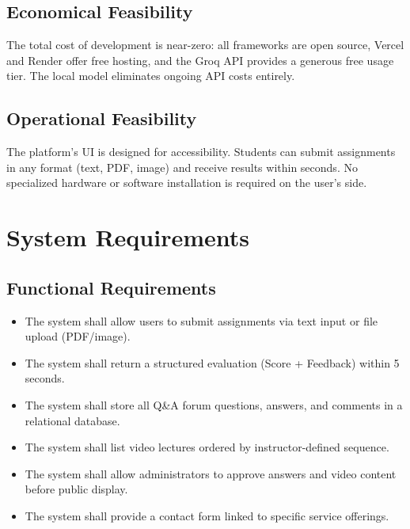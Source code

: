 \documentclass[12pt,a4paper]{report}
\begin{document}
\subsection{Economical Feasibility}
The total cost of development is near-zero: all frameworks are open source, Vercel and
Render offer free hosting, and the Groq API provides a generous free usage tier. The local
model eliminates ongoing API costs entirely.

\subsection{Operational Feasibility}
The platform's UI is designed for accessibility. Students can submit assignments in any
format (text, PDF, image) and receive results within seconds. No specialized hardware or
software installation is required on the user's side.

\section{System Requirements}

\subsection{Functional Requirements}
\begin{itemize}
    \item The system shall allow users to submit assignments via text input or file upload (PDF/image).
    \item The system shall return a structured evaluation (Score + Feedback) within 5 seconds.
    \item The system shall store all Q\&A forum questions, answers, and comments in a relational database.
    \item The system shall list video lectures ordered by instructor-defined sequence.
    \item The system shall allow administrators to approve answers and video content before public display.
    \item The system shall provide a contact form linked to specific service offerings.
\end{itemize}
\end{document}
